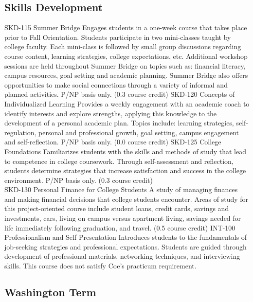 \documentclass[
  letterpaper,
]{scrbook}
\begin{document}
\subsection{Skills Development}\label{skills-development}

SKD-115 Summer Bridge Engages students in a one-week course that takes
place prior to Fall Orientation. Students participate in two
mini-classes taught by college faculty. Each mini-class is followed by
small group discussions regarding course content, learning strategies,
college expectations, etc. Additional workshop sessions are held
throughout Summer Bridge on topics such as: financial literacy, campus
resources, goal setting and academic planning. Summer Bridge also offers
opportunities to make social connections through a variety of informal
and planned activities. P/NP basis only. (0.3 course credit) SKD-120
Concepts of Individualized Learning Provides a weekly engagement with an
academic coach to identify interests and explore strengths, applying
this knowledge to the development of a personal academic plan. Topics
include: learning strategies, self-regulation, personal and professional
growth, goal setting, campus engagement and self-reflection. P/NP basis
only. (0.0 course credit) SKD-125 College Foundations Familiarizes
students with the skills and methods of study that lead to competence in
college coursework. Through self-assessment and reflection, students
determine strategies that increase satisfaction and success in the
college environment. P/NP basis only. (0.3 course credit)\\
SKD-130 Personal Finance for College Students A study of managing
finances and making financial decisions that college students encounter.
Areas of study for this project-oriented course include student loans,
credit cards, savings and investments, cars, living on campus versus
apartment living, savings needed for life immediately following
graduation, and travel. (0.5 course credit) INT-100 Professionalism and
Self Presentation Introduces students to the fundamentals of job-seeking
strategies and professional expectations. Students are guided through
development of professional materials, networking techniques, and
interviewing skills. This course does not satisfy Coe's practicum
requirement.

\subsection{Washington Term}\label{washington-term-1}
\end{document}
